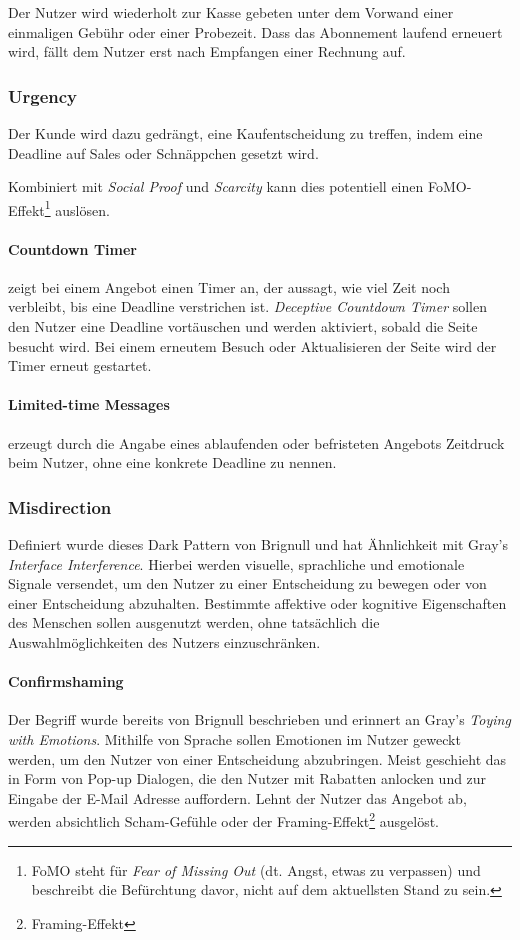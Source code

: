 \documentclass[a4paper]{article}
\begin{document}
Der Nutzer wird wiederholt zur Kasse gebeten unter dem Vorwand einer einmaligen Gebühr oder einer Probezeit. Dass das Abonnement laufend erneuert wird, fällt dem Nutzer erst nach Empfangen einer Rechnung auf.  

\subsubsection{Urgency}

Der Kunde wird dazu gedrängt, eine Kaufentscheidung zu treffen, indem eine Deadline auf Sales oder Schnäppchen gesetzt wird. 

Kombiniert mit \textit{Social Proof} und \textit{Scarcity} kann dies potentiell einen FoMO-Effekt\footnote{\label{foot:4} FoMO steht für \textit{Fear of Missing Out} (dt. Angst, etwas zu verpassen) und beschreibt die Befürchtung davor, nicht auf dem aktuellsten Stand zu sein.} auslösen.

\paragraph{Countdown Timer} zeigt bei einem Angebot einen Timer an, der aussagt, wie viel Zeit noch verbleibt, bis eine Deadline verstrichen ist. \textit{Deceptive Countdown Timer} sollen den Nutzer eine Deadline vortäuschen und werden aktiviert, sobald die Seite besucht wird. Bei einem erneutem Besuch oder Aktualisieren der Seite wird der Timer erneut gestartet.

\paragraph{Limited-time Messages} erzeugt durch die Angabe eines ablaufenden oder befristeten Angebots Zeitdruck beim Nutzer, ohne eine konkrete Deadline zu nennen.

\subsubsection{Misdirection}
Definiert wurde dieses Dark Pattern von Brignull und hat Ähnlichkeit mit Gray's \textit{Interface Interference}.
Hierbei werden visuelle, sprachliche und emotionale Signale versendet, um den Nutzer zu einer Entscheidung zu bewegen oder von einer Entscheidung abzuhalten. Bestimmte affektive oder kognitive Eigenschaften des Menschen sollen ausgenutzt werden, ohne tatsächlich die Auswahlmöglichkeiten des Nutzers einzuschränken.

\paragraph{Confirmshaming}
Der Begriff wurde bereits von Brignull beschrieben und erinnert an Gray's \textit{Toying with Emotions}. 
Mithilfe von Sprache sollen Emotionen im Nutzer geweckt werden, um den Nutzer von einer Entscheidung abzubringen. Meist geschieht das in Form von Pop-up Dialogen, die den Nutzer mit Rabatten anlocken und zur Eingabe der E-Mail Adresse auffordern. Lehnt der Nutzer das Angebot ab, werden absichtlich Scham-Gefühle oder der Framing-Effekt\footnote{\label{foot:5} Framing-Effekt} ausgelöst.
\end{document}
